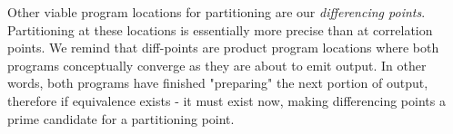 Other viable program locations for partitioning are our \emph{differencing points}. Partitioning at these locations is essentially more precise than at correlation points. We remind that diff-points are product program locations where both programs conceptually converge as they are about to emit output. In other words, both programs have finished "preparing" the next portion of output, therefore if equivalence exists - it must exist now, making differencing points a prime candidate for a partitioning point.




